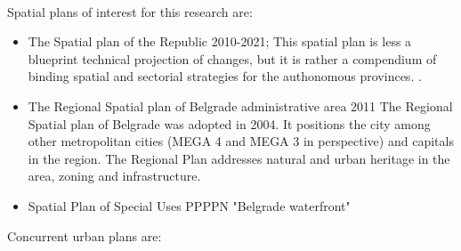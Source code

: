 \documentclass[11pt]{report}
\begin{document}
\\
Spatial plans of interest for this research are:
\begin{itemize}
\item The Spatial plan of the Republic 2010-2021;
This spatial plan is less a blueprint technical projection of changes, but it is rather a compendium of binding spatial and sectorial strategies for the authonomous provinces. \cite{Stojkov and Dobricic 2012 02}.
\item  The Regional Spatial plan of Belgrade administrative area 2011
The Regional Spatial plan of Belgrade was adopted in 2004. It positions the city among other metropolitan cities (MEGA 4 and MEGA 3 in perspective) and capitals in the region. The Regional Plan addresses natural and urban heritage in the area, zoning and infrastructure. 
\item Spatial Plan of Special Uses PPPPN "Belgrade waterfront"
\end{itemize}
Concurrent urban plans are:
\end{document}
